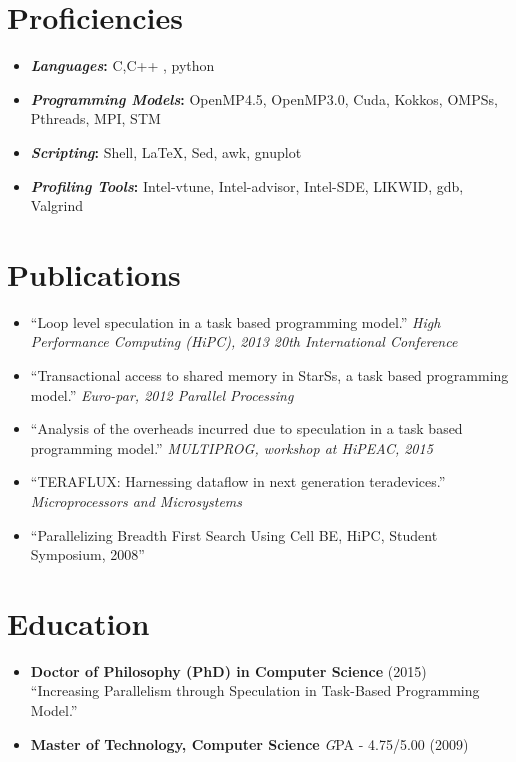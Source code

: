 \documentclass[margin]{res}
\begin{document}
\begin{resume}
\section{Proficiencies}
\begin{itemize}
    \item \textbf{\textit {Languages}:} C,C++ , python
    \item \textbf{\textit {Programming Models}:} OpenMP4.5, OpenMP3.0, Cuda, Kokkos, OMPSs, Pthreads, MPI, STM
    \item \textbf{\textit {Scripting}:} Shell, LaTeX, Sed, awk, gnuplot
    \item \textbf{\textit {Profiling Tools}:} Intel-vtune, Intel-advisor, Intel-SDE, LIKWID, gdb, Valgrind
\end{itemize}
%
\section{Publications}
%
\begin{itemize}
	   \item \enquote{Loop level speculation in a task based programming model.}
           \textit{High Performance Computing (HiPC), 2013 20th International Conference}
%
	   \item \enquote{Transactional access to shared memory in StarSs, a task based programming model.}
           \textit{Euro-par, 2012 Parallel Processing}
%
	   \item \enquote{Analysis of the overheads incurred due to speculation in a task based programming model.}
           \textit{MULTIPROG, workshop at HiPEAC, 2015}
%
	   \item \enquote{TERAFLUX: Harnessing dataflow in next generation teradevices.}
           \textit{Microprocessors and Microsystems}
%
	   \item \enquote{Parallelizing Breadth First Search Using Cell BE, HiPC, Student Symposium, 2008}
%
\end {itemize}
\section{Education}
%
\begin{itemize}
	   \item {\bf Doctor of Philosophy (PhD)  in Computer Science } (2015) \\
		\enquote{Increasing Parallelism through Speculation in Task-Based Programming Model.}
%
    \item {\bf Master of Technology, Computer Science } {\textit GPA - 4.75/5.00} (2009)
%
\end{itemize}
%
%

\end{resume}
\end{document}
